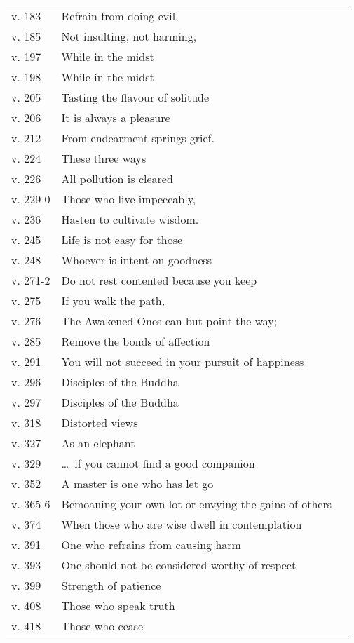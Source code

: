 {\begin{longtable}[c]{llr}
v. 183 & Refrain from doing evil, & \pageref{dhp-183}\\
v. 185 & Not insulting, not harming, & \pageref{dhp-185}\\
v. 197 & While in the midst & \pageref{dhp-197}\\
v. 198 & While in the midst & \pageref{dhp-198}\\
v. 205 & Tasting the flavour of solitude & \pageref{dhp-205}\\
v. 206 & It is always a pleasure & \pageref{dhp-206}\\
v. 212 & From endearment springs grief. & \pageref{dhp-212}\\
v. 224 & These three ways & \pageref{dhp-224}\\
v. 226 & All pollution is cleared & \pageref{dhp-226}\\
v. 229-0 & Those who live impeccably, & \pageref{dhp-229}\\
v. 236 & Hasten to cultivate wisdom. & \pageref{dhp-236}\\
v. 245 & Life is not easy for those & \pageref{dhp-245}\\
v. 248 & Whoever is intent on goodness & \pageref{dhp-248}\\
v. 271-2 & Do not rest contented because you keep & \pageref{dhp-271}\\
v. 275 & If you walk the path, & \pageref{dhp-275}\\
v. 276 & The Awakened Ones can but point the way; & \pageref{dhp-276}\\
v. 285 & Remove the bonds of affection & \pageref{dhp-285}\\
v. 291 & You will not succeed in your pursuit of happiness & \pageref{dhp-291}\\
v. 296 & Disciples of the Buddha & \pageref{dhp-296}\\
v. 297 & Disciples of the Buddha & \pageref{dhp-297}\\
v. 318 & Distorted views & \pageref{dhp-318}\\
v. 327 & As an elephant & \pageref{dhp-327}\\
v. 329 & \ldots\ if you cannot find a good companion & \pageref{dhp-329}\\
v. 352 & A master is one who has let go & \pageref{dhp-352}\\
v. 365-6 & Bemoaning your own lot or envying the gains of others & \pageref{dhp-365}\\
v. 374 & When those who are wise dwell in contemplation & \pageref{dhp-374}\\
v. 391 & One who refrains from causing harm & \pageref{dhp-391}\\
v. 393 & One should not be considered worthy of respect & \pageref{dhp-393}\\
v. 399 & Strength of patience & \pageref{dhp-399}\\
v. 408 & Those who speak truth & \pageref{dhp-408}\\
v. 418 & Those who cease & \pageref{dhp-418}\\
\end{longtable}

}

